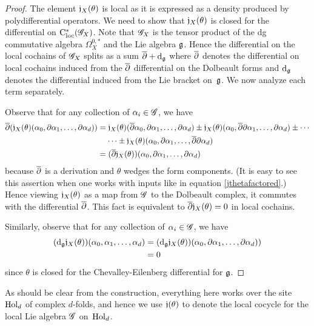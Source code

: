 \begin{proof} 
The element $\mathfrak j_X(\theta)$ is local as it is expressed as a density produced by polydifferential operators.
We need to show that $\mathfrak j_X(\theta)$ is closed for the differential on ${\rm C}_{\rm loc}^*(\mathscr G_X)$. 
Note that $\mathscr G_X$ is the tensor product of the dg commutative algebra $\Omega^{0,*}_X$ and the Lie algebra $\mathfrak g$.
Hence the differential on the local cochains of $\mathscr G_X$ splits as a sum $\overline{\partial} + {\rm d}_{\mathfrak g}$ where $\overline{\partial}$ denotes the differential on local cochains induced from the $\overline{\partial}$ differential on the Dolbeault forms and ${\rm d}_{\mathfrak g}$ denotes the differential induced from the Lie bracket on~$\mathfrak g$. 
We now analyze each term separately.

Observe that for any collection of $\alpha_i \in \mathscr G$, we have
\begin{align*}
\overline{\partial}(\mathfrak j_X(\theta)(\alpha_0,\partial \alpha_1,\ldots,\partial \alpha_d)) 
&= \mathfrak j_X(\theta)(\overline{\partial}\alpha_0,\partial \alpha_1,\ldots,\partial \alpha_d) \pm \mathfrak j_X(\theta)(\alpha_0,\overline{\partial} \partial \alpha_1,\ldots,\partial \alpha_d) \pm \cdots \\ & \;\;\;\; \cdots \pm \mathfrak j_X(\theta)(\alpha_0,\partial \alpha_1,\ldots,\overline{\partial}\partial \alpha_d)\\
&= (\overline{\partial} \mathfrak j_X(\theta))(\alpha_0,\partial \alpha_1,\ldots,\partial \alpha_d)
\end{align*}
because $\overline{\partial}$ is a derivation and $\theta$ wedges the form components.
(It is easy to see this assertion when one works with inputs like in equation \eqref{jthetafactored}.)
Hence viewing $\mathfrak j_X(\theta)$ as a map from $\mathscr G$ to the Dolbeault complex, 
it commutes with the differential $\overline{\partial}$.
This fact is equivalent to $\overline{\partial} \mathfrak j_X(\theta) = 0$ in local cochains.

Similarly, observe that for any collection of $\alpha_i \in \mathscr G$, we have
\begin{align*}
({\rm d}_\mathfrak g \mathfrak j_X(\theta))(\alpha_0, \alpha_1,\ldots, \alpha_d)
&= ({\rm d}_\mathfrak g\mathfrak j_X(\theta))(\alpha_0,\partial \alpha_1,\ldots,\partial \alpha_d)) \\
&= 0
\end{align*}
since $\theta$ is closed for the Chevalley-Eilenberg differential for $\mathfrak g$. 
\end{proof}

As should be clear from the construction, everything here works over the site ${\rm Hol}_d$ of complex $d$-folds, and hence we use $\mathfrak j(\theta)$ to denote the local cocycle for the local Lie algebra $\mathscr G$ on~${\rm Hol}_d$.

